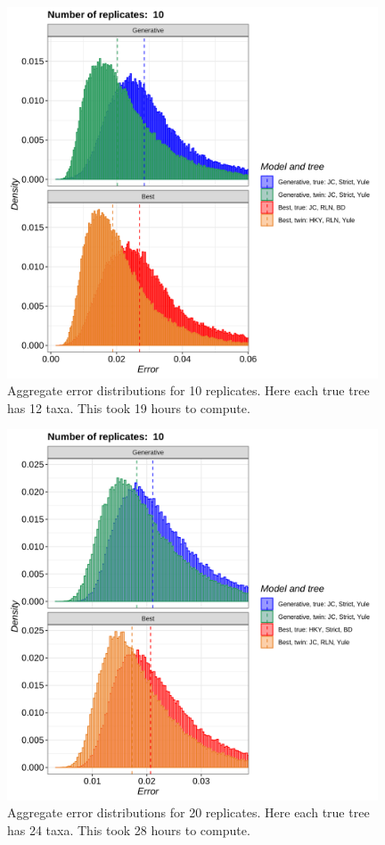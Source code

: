 \begin{figure}[H]
  \includegraphics[width=0.98\textwidth]{pirouette_example_32/errors.png}
  \caption{Aggregate error distributions for 10 replicates. Here each true tree has 12 taxa. This took 19 hours to compute.}
  \label{fig:example_12_taxa}
\end{figure}

\begin{figure}[H]
  \includegraphics[width=0.98\textwidth]{pirouette_example_33/errors.png}
    \caption{Aggregate error distributions for 20 replicates. Here each true tree has 24 taxa. This took 28 hours to compute.}
    \label{fig:example_24_taxa}
\end{figure}

